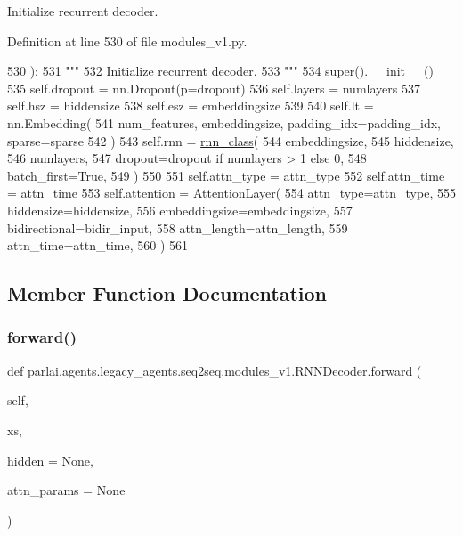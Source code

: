 \begin{DoxyVerb}Initialize recurrent decoder.
\end{DoxyVerb}
 

Definition at line 530 of file modules\+\_\+v1.\+py.


\begin{DoxyCode}
530     ):
531         \textcolor{stringliteral}{"""}
532 \textcolor{stringliteral}{        Initialize recurrent decoder.}
533 \textcolor{stringliteral}{        """}
534         super().\_\_init\_\_()
535         self.dropout = nn.Dropout(p=dropout)
536         self.layers = numlayers
537         self.hsz = hiddensize
538         self.esz = embeddingsize
539 
540         self.lt = nn.Embedding(
541             num\_features, embeddingsize, padding\_idx=padding\_idx, sparse=sparse
542         )
543         self.rnn = \hyperlink{namespaceseq2seq_1_1train_a46177da1cc74c4a2874e4a527d857f75}{rnn\_class}(
544             embeddingsize,
545             hiddensize,
546             numlayers,
547             dropout=dropout \textcolor{keywordflow}{if} numlayers > 1 \textcolor{keywordflow}{else} 0,
548             batch\_first=\textcolor{keyword}{True},
549         )
550 
551         self.attn\_type = attn\_type
552         self.attn\_time = attn\_time
553         self.attention = AttentionLayer(
554             attn\_type=attn\_type,
555             hiddensize=hiddensize,
556             embeddingsize=embeddingsize,
557             bidirectional=bidir\_input,
558             attn\_length=attn\_length,
559             attn\_time=attn\_time,
560         )
561 
\end{DoxyCode}


\subsection{Member Function Documentation}
\mbox{\label{classparlai_1_1agents_1_1legacy__agents_1_1seq2seq_1_1modules__v1_1_1RNNDecoder_aa0fdddaf98d3385b432a9b52a0d1adbb}} 
\subsubsection{\texorpdfstring{forward()}{forward()}}
{\footnotesize\ttfamily def parlai.\+agents.\+legacy\+\_\+agents.\+seq2seq.\+modules\+\_\+v1.\+R\+N\+N\+Decoder.\+forward (\begin{DoxyParamCaption}\item[{}]{self,  }\item[{}]{xs,  }\item[{}]{hidden = {\ttfamily None},  }\item[{}]{attn\+\_\+params = {\ttfamily None} }\end{DoxyParamCaption})}


